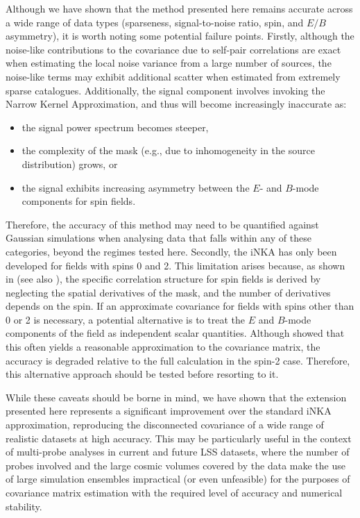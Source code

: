\documentclass[%
 reprint,
superscriptaddress,
nofootinbib,
 amsmath,amssymb,
 aps,
 prd,
]{revtex4-2}
\begin{document}
  Although we have shown that the method presented here remains accurate across a wide range of data types (sparseness, signal-to-noise ratio, spin, and $E/B$ asymmetry), it is worth noting some potential failure points. Firstly, although the noise-like contributions to the covariance due to self-pair correlations are exact when estimating the local noise variance from a large number of sources, the noise-like terms may exhibit additional scatter when estimated from extremely sparse catalogues. Additionally, the signal component involves invoking the Narrow Kernel Approximation, and thus will become increasingly inaccurate as:
  \begin{itemize}
    \item the signal power spectrum becomes steeper,
    \item the complexity of the mask (e.g., due to inhomogeneity in the source distribution) grows, or
    \item the signal exhibits increasing asymmetry between the $E$- and $B$-mode components for spin fields.
  \end{itemize}
  Therefore, the accuracy of this method may need to be quantified against Gaussian simulations when analysing data that falls within any of these categories, beyond the regimes tested here. Secondly, the iNKA has only been developed for fields with spins 0 and 2. This limitation arises because, as shown in \cite{1906.11765} (see also \cite{1609.09730}), the specific correlation structure for spin fields is derived by neglecting the spatial derivatives of the mask, and the number of derivatives depends on the spin. If an approximate covariance for fields with spins other than 0 or 2 is necessary, a potential alternative is to treat the $E$ and $B$-mode components of the field as independent scalar quantities. Although \cite{1906.11765} showed that this often yields a reasonable approximation to the covariance matrix, the accuracy is degraded relative to the full calculation in the spin-2 case. Therefore, this alternative approach should be tested before resorting to it.

  While these caveats should be borne in mind, we have shown that the extension presented here represents a significant improvement over the standard iNKA approximation, reproducing the disconnected covariance of a wide range of realistic datasets at high accuracy. This may be particularly useful in the context of multi-probe analyses in current and future LSS datasets, where the number of probes involved and the large cosmic volumes covered by the data make the use of large simulation ensembles impractical (or even unfeasible) for the purposes of covariance matrix estimation with the required level of accuracy and numerical stability.
\end{document}
